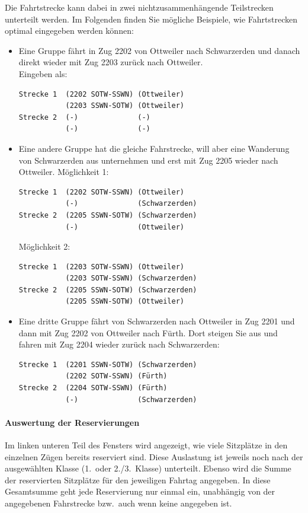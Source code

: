 Die Fahrtstrecke kann dabei in zwei nichtzusammenhängende Teilstrecken unterteilt werden.
Im Folgenden finden Sie mögliche Beispiele, wie Fahrtstrecken optimal eingegeben werden können:
\begin{itemize}
	\item Eine Gruppe fährt in Zug 2202 von Ottweiler nach Schwarzerden und danach direkt wieder mit Zug 2203 zurück nach Ottweiler.\\
	Eingeben als:
	\begin{verbatim}Strecke 1  (2202 SOTW-SSWN) (Ottweiler)
           (2203 SSWN-SOTW) (Ottweiler)
Strecke 2  (-)              (-)
           (-)              (-)
	\end{verbatim}
	\item
	Eine andere Gruppe hat die gleiche Fahrstrecke, will aber eine Wanderung von Schwarzerden aus unternehmen und erst mit Zug 2205 wieder nach Ottweiler.
	Möglichkeit 1:
	\begin{verbatim}Strecke 1  (2202 SOTW-SSWN) (Ottweiler)
           (-)              (Schwarzerden)
Strecke 2  (2205 SSWN-SOTW) (Schwarzerden)
           (-)              (Ottweiler)
	\end{verbatim}
	Möglichkeit 2:
	\begin{verbatim}Strecke 1  (2203 SOTW-SSWN) (Ottweiler)
           (2203 SOTW-SSWN) (Schwarzerden)
Strecke 2  (2205 SSWN-SOTW) (Schwarzerden)
           (2205 SSWN-SOTW) (Ottweiler)
	\end{verbatim}
	\item
	Eine dritte Gruppe fährt von Schwarzerden nach Ottweiler in Zug 2201 und dann mit Zug 2202 von Ottweiler nach Fürth.
	Dort steigen Sie aus und fahren mit Zug 2204 wieder zurück nach Schwarzerden:
	\begin{verbatim}
Strecke 1  (2201 SSWN-SOTW) (Schwarzerden)
           (2202 SOTW-SSWN) (Fürth)
Strecke 2  (2204 SOTW-SSWN) (Fürth)
           (-)              (Schwarzerden)
	\end{verbatim}
\end{itemize}


\paragraph{Auswertung der Reservierungen}
Im linken unteren Teil des Fensters wird angezeigt,
wie viele Sitzplätze in den einzelnen Zügen bereits reserviert sind.
Diese Auslastung ist jeweils noch nach der ausgewählten Klasse (1.\ oder 2./3.~Klasse) unterteilt.
Ebenso wird die Summe der reservierten Sitzplätze für den jeweiligen Fahrtag angegeben.
In diese Gesamtsumme geht jede Reservierung nur einmal ein,
unabhängig von der angegebenen Fahrstrecke bzw.\ auch wenn keine angegeben ist.


